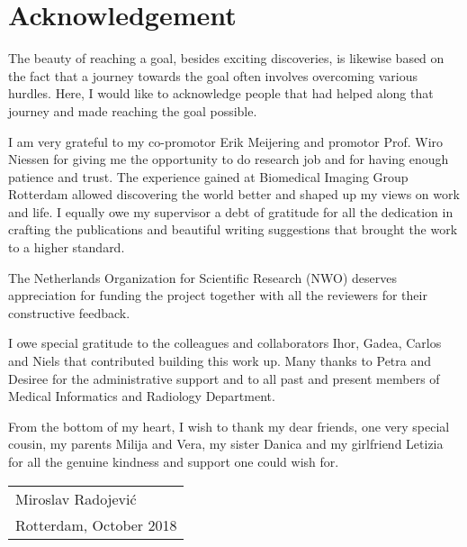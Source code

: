 %
% 

\chpos{14mm}{10mm}
\chapter*{Acknowledgement}

The beauty of reaching a goal, besides exciting discoveries, is likewise based on the fact that a journey towards the goal often involves overcoming various hurdles. Here, I would like to acknowledge people that had helped along that journey and made reaching the goal possible.

I am very grateful to my co-promotor Erik Meijering and promotor Prof. Wiro Niessen for giving me the opportunity to do research job and for having enough patience and trust. The experience gained at Biomedical Imaging Group Rotterdam allowed discovering the world better and shaped up my views on work and life. I equally owe my supervisor a debt of gratitude for all the dedication in crafting the publications and beautiful writing suggestions that brought the work to a higher standard.

The Netherlands Organization for Scientific Research (NWO) deserves appreciation for funding the project together with all the reviewers for their constructive feedback.

I owe special gratitude to the colleagues and collaborators Ihor, Gadea, Carlos and Niels that contributed building this work up. Many thanks to Petra and Desiree for the administrative support and to all past and present members of Medical Informatics and Radiology Department.

From the bottom of my heart, I wish to thank my dear friends, one very special cousin, my parents Milija and Vera, my sister Danica and my girlfriend Letizia for all the genuine kindness and support one could wish for.  

\bigskip
\begin{flushright}
  \begin{tabular}{@{}l@{}}
    Miroslav Radojevi\'{c}\\
    Rotterdam, October 2018
  \end{tabular}
\end{flushright}
